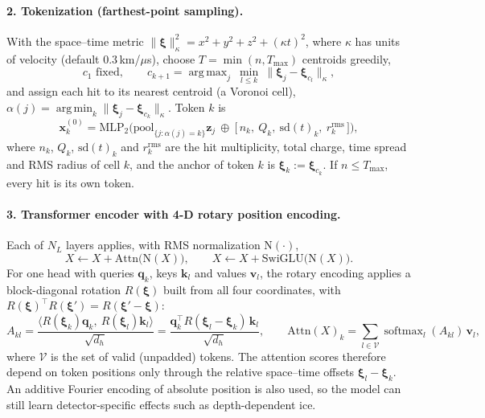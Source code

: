\documentclass[11pt]{article}
\theoremstyle{definition}
\DeclareMathOperator*{\argmin}{arg\,min}
\DeclareMathOperator*{\argmax}{arg\,max}
\DeclareMathOperator{\softmax}{softmax}
\begin{document}
\paragraph{2. Tokenization (farthest-point sampling).}
With the space--time metric $\|\bm{\xi}\|_\kappa^2 = x^2+y^2+z^2+(\kappa t)^2$, where $\kappa$
has units of velocity (default $0.3$\,km/$\mu$s), choose $T=\min(n,T_{\max})$ centroids greedily,
\begin{equation}
  c_1 \text{ fixed},\qquad
  c_{k+1} = \argmax_{j}\ \min_{l\le k}\ \|\bm{\xi}_j-\bm{\xi}_{c_l}\|_\kappa ,
\end{equation}
and assign each hit to its nearest centroid (a Voronoi cell),
$\alpha(j) = \argmin_k \|\bm{\xi}_j-\bm{\xi}_{c_k}\|_\kappa$. Token $k$ is
\begin{equation}
  \bm{x}_k^{(0)} = \mathrm{MLP}_2\Big(\mathrm{pool}_{\{j:\alpha(j)=k\}}\bm{z}_j\ \oplus\ \big[\,n_k,\ Q_k,\ \mathrm{sd}(t)_k,\ r^{\mathrm{rms}}_k\,\big]\Big),
\end{equation}
where $n_k$, $Q_k$, $\mathrm{sd}(t)_k$ and $r^{\mathrm{rms}}_k$ are the hit multiplicity, total
charge, time spread and RMS radius of cell $k$, and the anchor of token $k$ is
$\bm{\xi}_k := \bm{\xi}_{c_k}$. If $n\le T_{\max}$, every hit is its own token.

\paragraph{3. Transformer encoder with 4-D rotary position encoding.}
Each of $N_L$ layers applies, with RMS normalization $\mathrm{N}(\cdot)$,
\begin{equation}
  X \leftarrow X + \mathrm{Attn}\big(\mathrm{N}(X)\big),\qquad
  X \leftarrow X + \mathrm{SwiGLU}\big(\mathrm{N}(X)\big).
\end{equation}
For one head with queries $\bm{q}_k$, keys $\bm{k}_l$ and values $\bm{v}_l$, the rotary
encoding applies a block-diagonal rotation $R(\bm{\xi})$ built from all four coordinates, with
$R(\bm{\xi})^{\top}R(\bm{\xi}') = R(\bm{\xi}'-\bm{\xi})$:
\begin{equation}
  A_{kl} = \frac{\big\langle R(\bm{\xi}_k)\bm{q}_k,\ R(\bm{\xi}_l)\bm{k}_l\big\rangle}{\sqrt{d_h}}
         = \frac{\bm{q}_k^{\top}R(\bm{\xi}_l-\bm{\xi}_k)\,\bm{k}_l}{\sqrt{d_h}},
  \qquad
  \mathrm{Attn}(X)_k = \sum_{l\in\mathcal{V}}\softmax_l(A_{kl})\,\bm{v}_l ,
\end{equation}
where $\mathcal{V}$ is the set of valid (unpadded) tokens. The attention scores therefore
depend on token positions only through the relative space--time offsets
$\bm{\xi}_l-\bm{\xi}_k$. An additive Fourier encoding of absolute position is also used, so
the model can still learn detector-specific effects such as depth-dependent ice.
\end{document}
